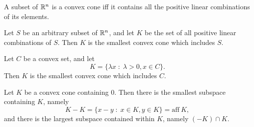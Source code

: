 \documentclass[11pt,a4paper]{article}
\begin{document}
\begin{corollary}\label{cor:convex_cone_conic_combinations}
    A subset of $\mathbb{R}^n$ is a convex cone iff it contains all the positive linear combinations of its elements.
\end{corollary}

\begin{corollary}\label{cor:convex_cone_conic_combinations_2}
    Let $S$ be an arbitrary subset of $\mathbb{R}^n$, and let $K$ be the set of all positive linear combinations of $S$. Then $K$ is the smallest convex cone which includes $S$.
\end{corollary}

\begin{corollary}\label{cor:convex_cone_conic_combinations_3}
    Let $C$ be a convex set, and let 
    \begin{equation*}
        K = \{\lambda x\;:\; \lambda > 0, x\in C\}.
    \end{equation*}
    Then $K$ is the smallest convex cone which includes $C$.
\end{corollary}

\begin{theorem}\label{thm:convex_cones_subspaces}
    Let $K$ be a convex cone containing $0$. Then there is the smallest subspace containing $K$, namely
    \begin{equation*}
        K - K = \{x-y\;:\;x\in K, y\in K\} = \text{aff}\ K,
    \end{equation*}
    and there is the largest subspace contained within $K$, namely $(-K)\cap K$.
\end{theorem}
\end{document}
